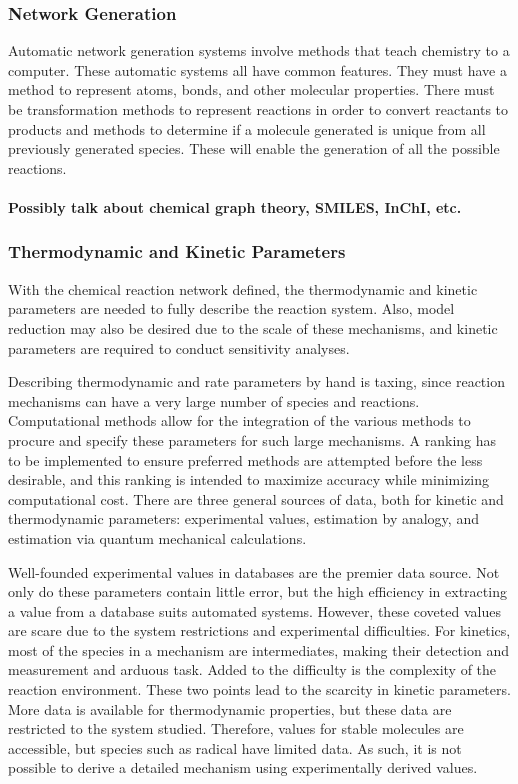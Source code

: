 \documentclass[12pt]{article}
\begin{document}
\subsubsection{Network Generation}
Automatic network generation systems involve methods that teach chemistry to a computer. These automatic systems all have common features. They must have a method to represent atoms, bonds, and other molecular properties. There must be transformation methods to represent reactions in order to convert reactants to products and methods to determine if a molecule generated is unique from all previously generated species. These will enable the generation of all the possible reactions.

\paragraph{Possibly talk about chemical graph theory, SMILES, InChI, etc.}

\subsubsection{Thermodynamic and Kinetic Parameters}
With the chemical reaction network defined, the thermodynamic and kinetic parameters are needed to fully describe the reaction system. Also, model reduction may also be desired due to the scale of these mechanisms, and kinetic parameters are required to conduct sensitivity analyses.

Describing thermodynamic and rate parameters by hand is taxing, since reaction mechanisms can have a very large number of species and reactions. Computational methods allow for the integration of the various methods to procure and specify these parameters for such large mechanisms. A ranking has to be implemented to ensure preferred methods are attempted before the less desirable, and this ranking is intended to maximize accuracy while minimizing computational cost. There are three general sources of data, both for kinetic and thermodynamic parameters: experimental values, estimation by analogy, and estimation via quantum mechanical calculations.

Well-founded experimental values in databases are the premier data source. Not only do these parameters contain little error, but the high efficiency in extracting a value from a database suits automated systems. However, these coveted values are scare due to the system restrictions and experimental difficulties. For kinetics, most of the species in a mechanism are intermediates, making their detection and measurement and arduous task. Added to the difficulty is the complexity of the reaction environment. These two points lead to the scarcity in kinetic parameters. More data is available for thermodynamic properties, but these data are restricted to the system studied. Therefore, values for stable molecules are accessible, but species such as radical have limited data.  As such, it is not possible to derive a detailed mechanism using experimentally derived values.
\end{document}
